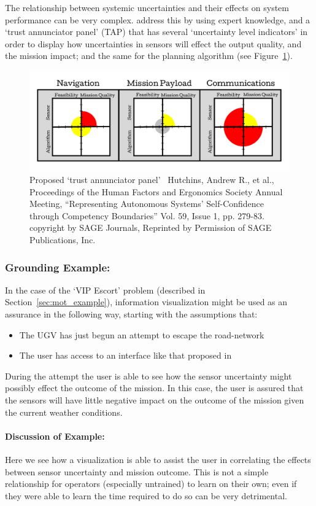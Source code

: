 The relationship between systemic uncertainties and their effects on system performance can be very complex. \citet{Hutchins2015-if} address this by using expert knowledge, and a `trust annunciator panel' (TAP) that has several `uncertainty level indicators' in order to display how uncertainties in sensors will effect the output quality, and the mission impact; and the same for the planning algorithm (see Figure~\ref{fig:hutchins_fig}).

\begin{figure}[htpb]
    \centering
    \includegraphics[width=0.7\linewidth]{Figures/Hutchins_fig.pdf}
    \caption{Proposed `trust annunciator panel'~\cite{Hutchins2015-if} Hutchins, Andrew R., et al., Proceedings of the Human Factors and Ergonomics Society Annual Meeting, ``Representing Autonomous Systems' Self-Confidence through Competency Boundaries'' Vol. 59, Issue 1, pp. 279-83. copyright  by SAGE Journals, Reprinted by Permission of SAGE Publications, Inc.}
    \label{fig:hutchins_fig}
\end{figure}

\subsubsection{Grounding Example:}
In the case of the `VIP Escort' problem (described in Section~\ref{sec:mot_example}), information visualization might be used as an assurance in the following way, starting with the assumptions that:

\begin{itemize}
    \item The UGV has just begun an attempt to escape the road-network
    \item The user has access to an interface like that proposed in \cite{Hutchins2015-if}
\end{itemize}

During the attempt the user is able to see how the sensor uncertainty might possibly effect the outcome of the mission. In this case, the user is assured that the sensors will have little negative impact on the outcome of the mission given the current weather conditions.

\paragraph{\textbf{Discussion of Example:}} Here we see how a visualization is able to assist the user in correlating the effects between sensor uncertainty and mission outcome. This is not a simple relationship for operators (especially untrained) to learn on their own; even if they were able to learn the time required to do so can be very detrimental.
